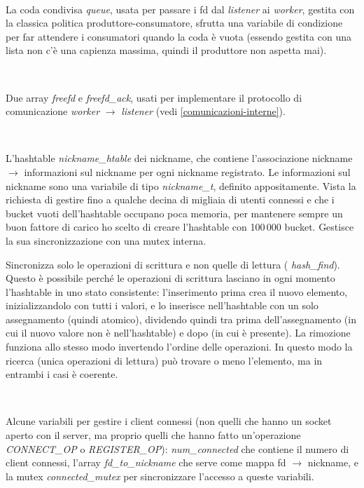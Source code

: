 \documentclass[a4paper]{article}
\theoremstyle{theorem}
\theoremstyle{remark}
\theoremstyle{definition}
\theoremstyle{corollary}
\theoremstyle{lemma}
\newcommand\codeName[1]{%
	\textit{#1}}
\begin{document}
\

La coda condivisa \codeName{queue}, usata per passare i fd dal \codeName{listener} ai \codeName{worker}, gestita con la classica politica produttore-consumatore, sfrutta una variabile di condizione per far attendere i consumatori quando la coda è vuota (essendo gestita con una lista non c'è una capienza massima, quindi il produttore non aspetta mai).

\

Due array \codeName{freefd} e \codeName{freefd\_ack}, usati per implementare il protocollo di comunicazione \codeName{worker} $\rightarrow$ \codeName{listener} (vedi \autoref{comunicazioni-interne}).

\

L'hashtable \codeName{nickname\_htable} dei nickname, che contiene l'associazione nickname $\rightarrow$ informazioni sul nickname per ogni nickname registrato. Le informazioni sul nickname sono una variabile di tipo \codeName{nickname\_t}, definito appositamente. Vista la richiesta di gestire fino a qualche decina di migliaia di utenti connessi e che i bucket vuoti dell'hashtable occupano poca memoria, per mantenere sempre un buon fattore di carico ho scelto di creare l'hashtable con 100\,000 bucket. Gestisce la sua sincronizzazione con una mutex interna.

Sincronizza solo le operazioni di scrittura e non quelle di lettura (\codeName{hash\_find}). Questo è possibile perché le operazioni di scrittura lasciano in ogni momento l'hashtable in uno stato consistente: l'inserimento prima crea il nuovo elemento, inizializzandolo con tutti i valori, e lo inserisce nell'hashtable con un solo assegnamento (quindi atomico), dividendo quindi tra prima dell'assegnamento (in cui il nuovo valore non è nell'hashtable) e dopo (in cui è presente). La rimozione funziona allo stesso modo invertendo l'ordine delle operazioni. In questo modo la ricerca (unica operazioni di lettura) può trovare o meno l'elemento, ma in entrambi i casi è coerente.


\

Alcune variabili per gestire i client connessi (non quelli che hanno un socket aperto con il server, ma proprio quelli che hanno fatto un'operazione \codeName{CONNECT\_OP} o \codeName{REGISTER\_OP}): \codeName{num\_connected} che contiene il numero di client connessi, l'array \codeName{fd\_to\_nickname} che serve come mappa fd $\rightarrow$ nickname, e la mutex \codeName{connected\_mutex} per sincronizzare l'accesso a queste variabili.
\end{document}
